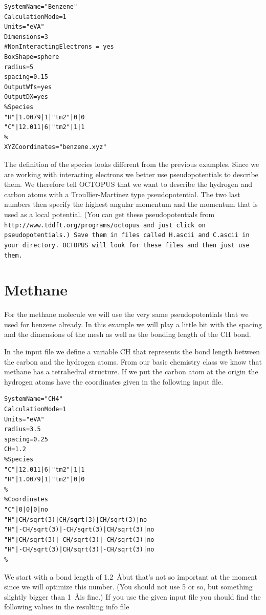 \documentclass{article}
\begin{document}
\begin{verbatim}
SystemName="Benzene"
CalculationMode=1
Units="eVA"
Dimensions=3
#NonInteractingElectrons = yes
BoxShape=sphere
radius=5
spacing=0.15
OutputWfs=yes
OutputDX=yes
%Species
"H"|1.0079|1|"tm2"|0|0
"C"|12.011|6|"tm2"|1|1
%
XYZCoordinates="benzene.xyz"
\end{verbatim}

The definition of the species looks different from the previous examples. Since
we are working with interacting electrons we better use pseudopotentials to
describe them. We therefore tell OCTOPUS that we want to describe the hydrogen
and carbon atoms with a Troullier-Martinez type pseudopotential. The two last
numbers then specify the highest angular momentum and the momentum that is used
as a local potential. (You can get these pseudopotentials from \tt
http://www.tddft.org/programs/octopus and just click on pseudopotentials\rm.)
Save them in files called H.ascii and C.ascii in your directory. OCTOPUS will
look for these files and then just use them.


\section{Methane}

For the methane molecule we will use the very same pseudopotentials that we used
for benzene already. In this example we will play a little bit with the spacing
and the dimensions of the mesh as well as the bonding length of the CH bond.

In the input file we define a variable CH that represents the bond length
between the carbon and the hydrogen atoms. From our basic chemistry class we
know that methane has a tetrahedral structure. If we put the carbon atom at the
origin the hydrogen atoms have the coordinates given in the following input
file.

\begin{verbatim}
SystemName="CH4"
CalculationMode=1
Units="eVA"
radius=3.5
spacing=0.25
CH=1.2
%Species
"C"|12.011|6|"tm2"|1|1
"H"|1.0079|1|"tm2"|0|0
%
%Coordinates
"C"|0|0|0|no
"H"|CH/sqrt(3)|CH/sqrt(3)|CH/sqrt(3)|no
"H"|-CH/sqrt(3)|-CH/sqrt(3)|CH/sqrt(3)|no
"H"|CH/sqrt(3)|-CH/sqrt(3)|-CH/sqrt(3)|no
"H"|-CH/sqrt(3)|CH/sqrt(3)|-CH/sqrt(3)|no
%
\end{verbatim}

We start with a bond length of 1.2~\AA but that's not so important at the
moment since we will optimize this number. (You should not use 5 or so, but
something slightly bigger than 1~\AA is fine.) If you use the given input
file you should find the following values in the resulting info file
\end{document}
